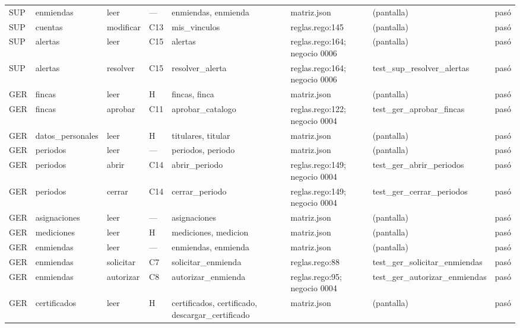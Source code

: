 \begin{center}
\begin{longtable}{@{}p{0.6cm} p{1.7cm} p{1.2cm} p{0.9cm} p{3.4cm} p{2.6cm} p{3.4cm} p{0.8cm}@{}}
SUP & enmiendas & leer & — & enmiendas, \allowbreak{}enmienda & matriz.json & (pantalla) & pasó \\
SUP & cuentas & modificar & C13 & mis\_vinculos & reglas.rego:145 & (pantalla) & pasó \\
SUP & alertas & leer & C15 & alertas & reglas.rego:164; negocio 0006 & (pantalla) & pasó \\
SUP & alertas & resolver & C15 & resolver\_alerta & reglas.rego:164; negocio 0006 & test\_\allowbreak{}sup\_\allowbreak{}resolver\_\allowbreak{}alertas & pasó \\
GER & fincas & leer & H & fincas, \allowbreak{}finca & matriz.json & (pantalla) & pasó \\
GER & fincas & aprobar & C11 & aprobar\_catalogo & reglas.rego:122; negocio 0004 & test\_\allowbreak{}ger\_\allowbreak{}aprobar\_\allowbreak{}fincas & pasó \\
GER & datos\_\allowbreak{}personales & leer & H & titulares, \allowbreak{}titular & matriz.json & (pantalla) & pasó \\
GER & periodos & leer & — & periodos, \allowbreak{}periodo & matriz.json & (pantalla) & pasó \\
GER & periodos & abrir & C14 & abrir\_periodo & reglas.rego:149; negocio 0004 & test\_\allowbreak{}ger\_\allowbreak{}abrir\_\allowbreak{}periodos & pasó \\
GER & periodos & cerrar & C14 & cerrar\_periodo & reglas.rego:149; negocio 0004 & test\_\allowbreak{}ger\_\allowbreak{}cerrar\_\allowbreak{}periodos & pasó \\
GER & asignaciones & leer & — & asignaciones & matriz.json & (pantalla) & pasó \\
GER & mediciones & leer & H & mediciones, \allowbreak{}medicion & matriz.json & (pantalla) & pasó \\
GER & enmiendas & leer & — & enmiendas, \allowbreak{}enmienda & matriz.json & (pantalla) & pasó \\
GER & enmiendas & solicitar & C7 & solicitar\_enmienda & reglas.rego:88 & test\_\allowbreak{}ger\_\allowbreak{}solicitar\_\allowbreak{}enmiendas & pasó \\
GER & enmiendas & autorizar & C8 & autorizar\_enmienda & reglas.rego:95; negocio 0004 & test\_\allowbreak{}ger\_\allowbreak{}autorizar\_\allowbreak{}enmiendas & pasó \\
GER & certificados & leer & H & certificados, \allowbreak{}certificado, \allowbreak{}descargar\_certificado & matriz.json & (pantalla) & pasó \\

\end{longtable}
\end{center}

